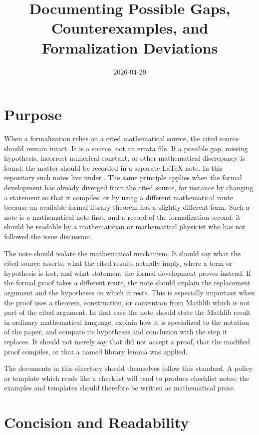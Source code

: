 \documentclass[11pt]{article}
\title{Documenting Possible Gaps, Counterexamples, and Formalization Deviations}
\author{}
\date{2026-04-29}
\begin{document}
\maketitle

\section{Purpose}

When a formalization relies on a cited mathematical source, the cited source
should remain intact.  It is a source, not an errata file.  If a possible gap,
missing hypothesis, incorrect numerical constant, or other mathematical
discrepancy is found, the matter should be recorded in a separate LaTeX note.
In this repository such notes live under .  The same
principle applies when the formal development has already diverged from the
cited source, for instance by changing a statement so that it compiles, or by
using a different mathematical route because an available formal-library theorem
has a slightly different form.  Such a note is a mathematical note first, and a
record of the formalization second: it should be readable by a mathematician or
mathematical physicist who has not followed the issue discussion.

The note should isolate the mathematical mechanism.  It should say what the
cited source asserts, what the cited results actually imply, where a term or
hypothesis is lost, and what statement the formal development proves instead.
If the formal proof takes a different route, the note should explain the
replacement argument and the hypotheses on which it rests.  This is especially
important when the proof uses a theorem, construction, or convention from
Mathlib which is not part of the cited argument.  In that case the note should
state the Mathlib result in ordinary mathematical language, explain how it is
specialized to the notation of the paper, and compare its hypotheses and
conclusion with the step it replaces.  It should not merely say that \Lean{} did
not accept a proof, that the modified proof compiles, or that a named library
lemma was applied.

The documents in this directory should themselves follow this standard.  A
policy or template which reads like a checklist will tend to produce checklist
notes; the examples and templates should therefore be written as mathematical
prose.

\section{Concision and Readability}
\end{document}
